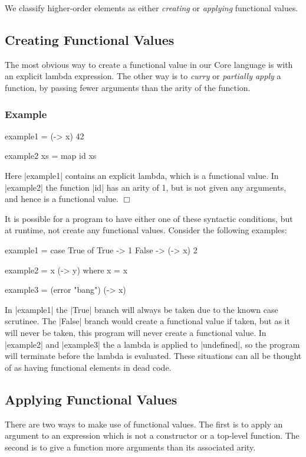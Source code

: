 \documentclass[preprint]{sigplanconf}
\newcounter{exmp}
\newenvironment{exampleany}[1]
    {\subsubsection*{Example #1}}
    {\hfill$\Box$}
\newenvironment{example}
    {\refstepcounter{exmp}
     \begin{exampleany}{\arabic{exmp}}}
    {\end{exampleany}}
\begin{document}
We classify higher-order elements as either \textit{creating} or \textit{applying} functional values.

\subsection{Creating Functional Values}

The most obvious way to create a functional value in our Core language is with an explicit lambda expression. The other way is to \textit{curry} or \textit{partially apply} a function, by passing fewer arguments than the arity of the function.

\begin{example}
\begin{code}
example1 = (\x -> x) 42

example2 xs = map id xs
\end{code}

Here |example1| contains an explicit lambda, which is a functional value. In |example2| the function |id| has an arity of 1, but is not given any arguments, and hence is a functional value.
\end{example}

It is possible for a program to have either one of these syntactic conditions, but at runtime, not create any functional values. Consider the following examples:

\begin{code}
example1 = case  True of
                 True   -> 1
                 False  -> (\x -> x) 2

example2 = x (\y -> y)
    where x = x

example3 = (error "bang") (\x -> x)
\end{code}

In |example1| the |True| branch will always be taken due to the known case scrutinee. The |False| branch would create a functional value if taken, but as it will never be taken, this program will never create a functional value. In |example2| and |example3| the a lambda is applied to |undefined|, so the program will terminate before the lambda is evaluated. These situations can all be thought of as having functional elements in dead code.


\subsection{Applying Functional Values}

There are two ways to make use of functional values. The first is to apply an argument to an expression which is not a constructor or a top-level function. The second is to give a function more arguments than its associated arity.
\end{document}
